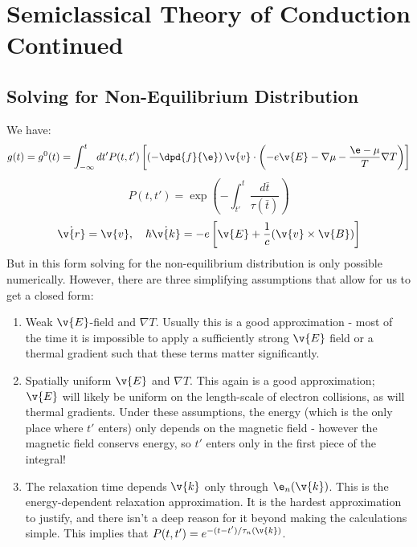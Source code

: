 \section{Semiclassical Theory of Conduction Continued}

\subsection{Solving for Non-Equilibrium Distribution}
We have:
\begin{equation}
    g(t) = g^0(t) = \int_{-\infty}^t dt' P(t, t')\left[\left(-\dpd{f}{\e}\right)\v{v} \cdot \left(-e\v{E} - \nabla \mu - \frac{\e - \mu}{T}\nabla T\right)\right]
\end{equation}
\begin{equation}
    P(t, t') = \exp(-\int_{t'}^t \frac{d\bar{t}}{\tau(\bar{t})})
\end{equation}
\begin{equation}
    \dot{\v{r}} = \v{v}, \quad \hbar \dot{\v{k}} = -e\left[\v{E} + \frac{1}{c}(\v{v} \times \v{B})\right]
\end{equation}
But in this form solving for the non-equilibrium distribution is only possible numerically. However, there are three simplifying assumptions that allow for us to get a closed form:
\begin{enumerate}
    \item Weak $\v{E}$-field and $\nabla T$. Usually this is a good approximation - most of the time it is impossible to apply a sufficiently strong $\v{E}$ field or a thermal gradient such that these terms matter significantly.
    \item Spatially uniform $\v{E}$ and $\nabla T$. This again is a good approximation; $\v{E}$ will likely be uniform on the length-scale of electron collisions, as will thermal gradients. Under these assumptions, the energy (which is the only place where $t'$ enters) only depends on the magnetic field - however the magnetic field conservs energy, so $t'$ enters only in the first piece of the integral!
    \item The relaxation time depends $\v{k}$ only through $\e_n(\v{k})$. This is the energy-dependent relaxation approximation. It is the hardest approximation to justify, and there isn't a deep reason for it beyond making the calculations simple. This implies that $P(t, t') = e^{-(t-t')/\tau_n(\v{k})}$.
\end{enumerate}

